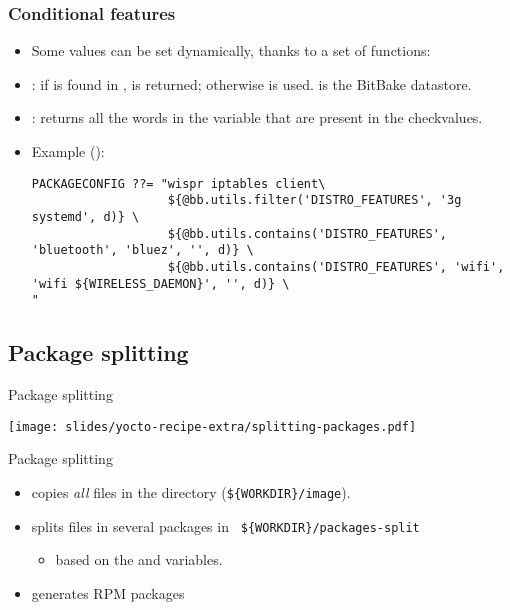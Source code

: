 \begin{frame}[fragile]
  \frametitle{Conditional features}
  \begin{itemize}
    \item Some values can be set dynamically, thanks to a set of
      functions:
    \item {}: if  is found in
      ,  is returned; otherwise
       is used.  is the BitBake datastore.
    \item {}: returns
      all the words in the variable that are present in the
      checkvalues.
    \item Example ():
      \begin{block}{}
      \fontsize{7.7}{7.7}\selectfont
      \begin{verbatim}
PACKAGECONFIG ??= "wispr iptables client\
                   ${@bb.utils.filter('DISTRO_FEATURES', '3g systemd', d)} \
                   ${@bb.utils.contains('DISTRO_FEATURES', 'bluetooth', 'bluez', '', d)} \
                   ${@bb.utils.contains('DISTRO_FEATURES', 'wifi', 'wifi ${WIRELESS_DAEMON}', '', d)} \
"
      \end{verbatim}
      \end{block}
  \end{itemize}
\end{frame}

\subsection{Package splitting}

\begin{frame}{Package splitting}
  \begin{center}
    \texttt{[image: slides/yocto-recipe-extra/splitting-packages.pdf]}
  \end{center}
\end{frame}

\begin{frame}{Package splitting}
  \begin{itemize}
    \item {} copies {\em all} files in the  directory
      ({\tt \$\{WORKDIR\}/image}).
    \item \code{do_package} splits files in several packages in {\tt
      \$\{WORKDIR\}/packages-split}
      \begin{itemize}
        \item based on the  and  variables.
      \end{itemize}
    \item {} generates RPM packages
  \end{itemize}
\end{frame}

